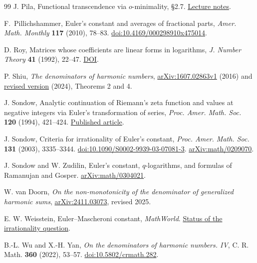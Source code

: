\documentclass[11pt,a4paper,oneside,openany]{report}
\theoremstyle{remark}\newtheorem{remark}[theorem]{Remark}
\numberwithin{equation}{section}
\begin{document}
\begin{thebibliography}{99}
 J. Pila, Functional transcendence via $o$-minimality, \S2.7. \href{https://people.maths.ox.ac.uk/pila/LMSNotes.pdf}{Lecture notes}.

 F.~Pillichshammer, Euler's constant and averages of fractional parts, \emph{Amer. Math. Monthly} \textbf{117} (2010), 78--83. \href{https://doi.org/10.4169/000298910x475014}{doi:10.4169/000298910x475014}.

 D. Roy, Matrices whose coefficients are linear forms in logarithms, \emph{J. Number Theory} \textbf{41} (1992), 22--47. \href{https://doi.org/10.1016/0022-314X(92)90081-Y}{DOI}.

 P. Shiu, \emph{The denominators of harmonic numbers}, \href{https://arxiv.org/abs/1607.02863v1}{arXiv:1607.02863v1} (2016) and \href{https://arxiv.org/abs/1607.02863v2}{revised version} (2024), Theorems 2 and 4.

 J. Sondow, Analytic continuation of Riemann's zeta function and values at negative integers via Euler's transformation of series, \emph{Proc. Amer. Math. Soc.} \textbf{120} (1994), 421--424. \href{https://doi.org/10.1090/S0002-9939-1994-1172954-7}{Published article}.

 J. Sondow, Criteria for irrationality of Euler's constant, \emph{Proc. Amer. Math. Soc.} \textbf{131} (2003), 3335--3344. \href{https://doi.org/10.1090/S0002-9939-03-07081-3}{doi:10.1090/S0002-9939-03-07081-3}. \href{https://arxiv.org/abs/math/0209070}{arXiv:math/0209070}.

 J. Sondow and W. Zudilin, Euler's constant, $q$-logarithms, and formulas of Ramanujan and Gosper. \href{https://arxiv.org/abs/math/0304021}{arXiv:math/0304021}.

 W. van Doorn, \emph{On the non-monotonicity of the denominator of generalized harmonic sums}, \href{https://arxiv.org/abs/2411.03073}{arXiv:2411.03073}, revised 2025.

 E. W. Weisstein, Euler--Mascheroni constant, \emph{MathWorld}. \href{https://mathworld.wolfram.com/Euler-MascheroniConstant.html}{Status of the irrationality question}.

 B.-L. Wu and X.-H. Yan, \emph{On the denominators of harmonic numbers. IV}, C. R. Math. \textbf{360} (2022), 53--57. \href{https://doi.org/10.5802/crmath.282}{doi:10.5802/crmath.282}.

\end{thebibliography}
\end{document}
